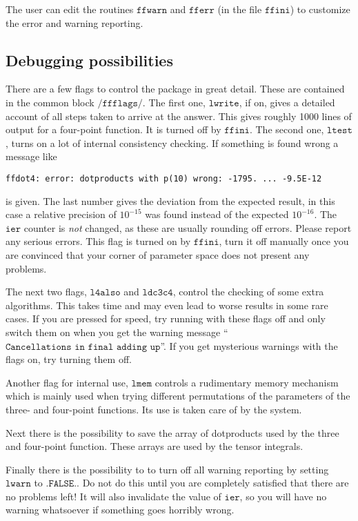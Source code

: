 \documentclass[twoside,12pt]{report}
\def\Code#1{\ensuremath{\texttt{#1}}}
\begin{document}
\begin{appendix}
The user can edit the routines \Code{ffwarn} and \Code{fferr} (in the 
file \Code{ffini}) to customize the error and warning reporting.


\subsection{Debugging possibilities}
\label{sec:debugging}

There are a few flags to control the package in great detail.  These are 
contained in the common block \Code{/ffflags/}.  The first one, \Code{lwrite}, 
if on, gives a detailed account of all steps taken to arrive at the answer.  
This gives roughly 1000 lines of output for a four-point function.  It is 
turned off by \Code{ffini}.  The second one, \Code{ltest}, turns on a lot of 
internal consistency checking.  If something is found wrong a message like
\begin{verbatim}
ffdot4: error: dotproducts with p(10) wrong: -1795. ... -9.5E-12
\end{verbatim}
is given.  The last number gives the deviation from the expected result, in 
this case a relative precision of $10^{-15}$ was found instead of the expected 
$10^{-16}$.  The \Code{ier} counter is {\em not} changed, as these are usually 
rounding off errors.  Please report any serious errors.  This flag is 
turned on by \Code{ffini}, turn it off manually once you are convinced that 
your corner of parameter space does not present any problems.

The next two flags, \Code{l4also} and \Code{ldc3c4}, control the 
checking of some extra algorithms.  This takes time and may even lead to 
worse results in some rare cases.  If you are pressed for speed, try 
running with these flags off and only switch them on when you get the 
warning message ``\Code{Cancellations in final adding up}''.  If you get 
mysterious warnings with the flags on, try turning them off.

Another flag for internal use, \Code{lmem} controls a rudimentary memory 
mechanism which is mainly used when trying different permutations of the 
parameters of the three- and four-point functions.  Its use is taken care of 
by the system.

Next there is the possibility to save the array of dotproducts used by the 
three and four-point function.  These arrays are used by the tensor integrals.

Finally there is the possibility to to turn off all warning reporting by 
setting \Code{lwarn} to \Code{.FALSE.}.  Do not do this until you are completely 
satisfied that there are no problems left!  It 
will also invalidate the value of \Code{ier}, so you will have no warning 
whatsoever if something goes horribly wrong.


\end{appendix}
\end{document}
